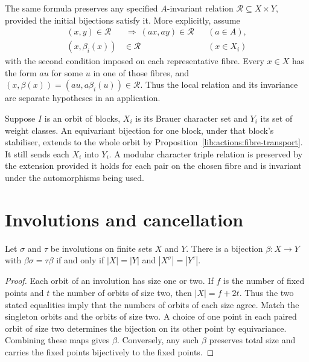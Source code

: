 The same formula preserves any specified $A$-invariant relation
$\mathcal R\subseteq X\times Y$, provided the initial bijections
satisfy it. More explicitly, assume
\begin{align*}
 (x,y)\in\mathcal R&\ \Longrightarrow\ (ax,ay)\in\mathcal R
   &&(a\in A),\\
 (x,\beta_i(x))&\in\mathcal R &&(x\in X_i)
\end{align*}
with the second condition imposed on each representative fibre.
Every $x\in X$ has the form $au$ for
some $u$ in one of those fibres, and
$(x,\beta(x))=(au,a\beta_i(u))\in\mathcal R$. Thus the local relation and
its invariance are separate hypotheses in an application.

\begin{example}
Suppose $I$ is an orbit of blocks, $X_i$ is its Brauer character set and
$Y_i$ its set of weight classes. An equivariant bijection for one block,
under that block's stabiliser, extends to the whole orbit by
Proposition~\ref{lib:actions:fibre-transport}. It still sends each $X_i$
into $Y_i$. A modular character triple relation is preserved by the
extension provided it holds for each pair on the chosen fibre and is
invariant under the automorphisms being used.
\end{example}

\section{Involutions and cancellation}

\begin{proposition}
\label{lib:actions:involutions}
Let $\sigma$ and $\tau$ be involutions on finite sets $X$ and $Y$.
There is a bijection $\beta:X\to Y$ with $\beta\sigma=\tau \beta$ if and only if
$|X|=|Y|$ and $|X^\sigma|=|Y^\tau|$.
\end{proposition}
\begin{proof}
Each orbit of an involution has size one or two. If $f$ is the number
of fixed points and $t$ the number of orbits of size two, then
$|X|=f+2t$. Thus the two stated equalities imply that the numbers of
orbits of each size agree. Match the singleton orbits and the orbits of
size two. A choice of one point in each paired orbit of size two determines
the bijection on its other point by equivariance. Combining these maps gives
$\beta$. Conversely, any such $\beta$ preserves total size and carries the fixed
points bijectively to the fixed points.
\end{proof}

